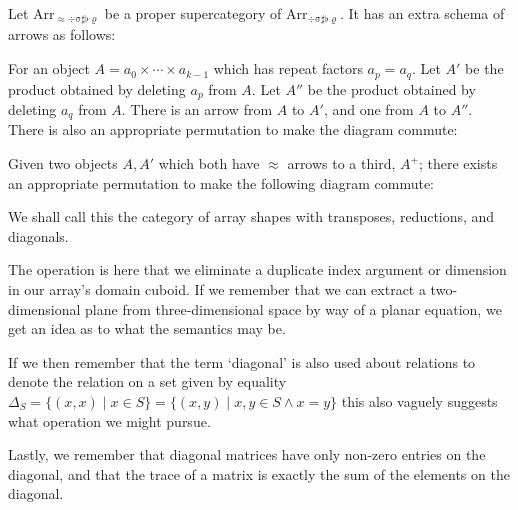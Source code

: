 \documentclass{DIKU-report-variant}
\newcommand\mrm[1]{\mathrm{#1}}
\newcommand\brm[1]{\bm{\mrm{#1}}}
\newcommand\Arr[1]{{\brm{Arr}_{\brm{#1}}}}
\newcommand\DSSFR{\div\sigma\sharp\flat\varrho}
\newcommand\ADSSFR{\approx\div\sigma\sharp\flat\varrho}
\begin{document}
\begin{definition}
  \label{def:category-of-diagonals}
  Let \(\Arr\ADSSFR\) be a proper supercategory of \(\Arr\DSSFR\).
  It has an extra schema of arrows as follows:

  For an object \(A = a_0 \times \cdots \times a_{k-1}\) which has repeat factors
  \(a_p = a_q\). Let \(A'\) be the product obtained by deleting
  \(a_p\) from \(A\). Let \(A''\) be the product obtained by deleting \(a_q\) from \(A\).
  There is an arrow from \(A\) to \(A'\), and one from \(A\) to \(A''\).
  There is also an appropriate permutation to make the diagram commute:
  \begin{center}
  \end{center}

  Given two objects \(A, A'\) which both have \(\approx\) arrows to a third, \(A^+\); there
  exists an appropriate permutation to make the following diagram commute:
        
  \begin{center}
  \end{center}

  We shall call this the category of array shapes with transposes, reductions, and
  diagonals.
\end{definition}

The operation is here that we eliminate a duplicate index argument or dimension in our array's
domain cuboid. If we remember that we can extract a two-dimensional plane from
three-dimensional space by way of a planar equation, we get an idea as to what the semantics
may be.

If we then remember that the term `diagonal' is also used about relations to denote the
relation on a set given by equality
\(\Delta_S = \{ (x, x) \mid x \in S \} = \{ (x, y) \mid x, y \in S \land x = y \}\)
this also vaguely suggests what operation we might pursue.

Lastly, we remember that diagonal matrices have only non-zero entries on the diagonal,
and that the trace of a matrix is exactly the sum of the elements on the diagonal.
\end{document}
